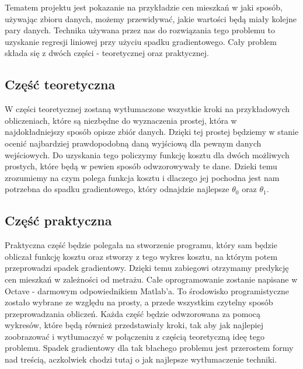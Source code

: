 Tematem projektu jest pokazanie na przykładzie cen mieszkań w jaki sposób, używając zbioru danych, możemy przewidywać, jakie wartości będą miały kolejne pary danych. Technika używana przez nas do rozwiązania tego problemu to uzyskanie regresji liniowej przy użyciu spadku gradientowego. Cały problem składa się z dwóch części - teoretycznej oraz praktycznej.
	\subsection{Część teoretyczna}
W części teoretycznej zostaną wytłumaczone wszystkie kroki na przykładowych obliczeniach, które są niezbędne do wyznaczenia prostej, która w najdokładniejszy sposób opisze zbiór danych. Dzięki tej prostej będziemy w stanie ocenić najbardziej prawdopodobną daną wyjściową dla pewnym danych wejściowych. Do uzyskania tego policzymy funkcję kosztu dla dwóch możliwych prostych, które będą w pewien sposób odwzorowywały te dane. Dzieki temu zrozumiemy na czym polega funkcja kosztu i dlaczego jej pochodna jest nam potrzebna do spadku gradientowego, który odnajdzie najlepsze $\theta_{0}$ oraz $\theta_{1}$.
	\subsection{Część praktyczna}
Praktyczna część będzie polegała na stworzenie programu, który sam będzie obliczał funkcję kosztu oraz stworzy z tego wykres kosztu, na którym potem przeprowadzi spadek gradientowy. Dzięki temu zabiegowi otrzymamy predykcję cen mieszkań w zależności od metrażu. Całe oprogramowanie zostanie napisane w Octave - darmowym odpowiednikiem Matlab'a. To środowisko programistyczne zostało wybrane ze względu na prosty, a przede wszystkim czytelny sposób przeprowadzania obliczeń. Każda część będzie odwzorowana za pomocą wykresów, które będą również przedstawiały kroki, tak aby jak najlepiej zoobrazować i wytłumaczyć w połączeniu z częścią teoretyczną ideę tego problemu. Spadek gradientowy dla tak błachego problemu jest przerostem formy nad treścią, aczkolwiek chodzi tutaj o jak najlepsze wytłumaczenie techniki.